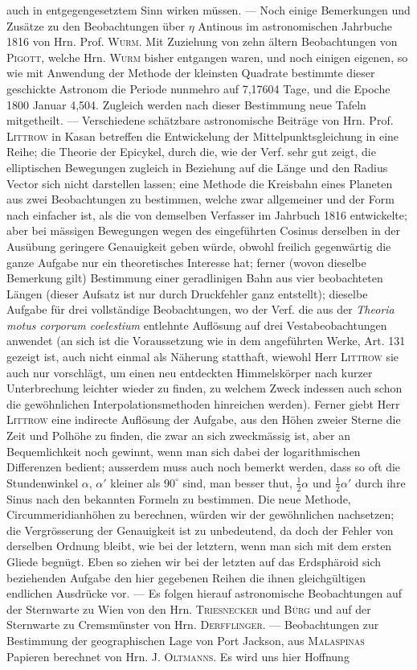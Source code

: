 auch in entgegengesetztem Sinn wirken müssen. --- Noch einige Bemerkungen und Zusätze zu den Beobachtungen über $\eta$ Antinous im astronomischen Jahrbuche 1816 von Hrn. Prof. \textsc{Wurm}. Mit Zuziehung von zehn ältern Beobachtungen von \textsc{Pigott}, welche Hrn. \textsc{Wurm} bisher entgangen waren, und noch einigen eigenen, so wie mit Anwendung der Methode der kleinsten Quadrate bestimmte dieser geschickte Astronom die Periode nunmehro auf 7,17604 Tage, und die Epoche 1800 Januar 4,504. Zugleich werden nach dieser Bestimmung neue Tafeln mitgetheilt. --- Verschiedene schätzbare astronomische Beiträge von Hrn. Prof. \textsc{Littrow} in Kasan betreffen die Entwickelung der Mittelpunktsgleichung in eine Reihe; die Theorie der Epicykel, durch die, wie der Verf. sehr gut zeigt, die elliptischen Bewegungen zugleich in Beziehung auf die Länge und den Radius Vector sich nicht darstellen lassen; eine Methode die Kreisbahn eines Planeten aus zwei Beobachtungen zu bestimmen, welche zwar allgemeiner und der Form nach einfacher ist, als die von demselben Verfasser im Jahrbuch 1816 entwickelte; aber bei mässigen Bewegungen wegen des eingeführten Cosinus derselben in der Ausübung geringere Genauigkeit geben würde, obwohl freilich gegenwärtig die ganze Aufgabe nur ein theoretisches Interesse hat; ferner (wovon dieselbe Bemerkung gilt) Bestimmung einer geradlinigen Bahn aus vier beobachteten Längen (dieser Aufsatz ist nur durch Druckfehler ganz entstellt); dieselbe Aufgabe für drei vollständige Beobachtungen, wo der Verf. die aus der \emph{Theoria motus corporum coelestium} entlehnte Auflösung auf drei Vestabeobachtungen anwendet (an sich ist die Voraussetzung wie in dem angeführten Werke, Art. 131 gezeigt ist, auch nicht einmal als Näherung statthaft, wiewohl Herr \textsc{Littrow} sie auch nur vorschlägt, um einen neu entdeckten Himmelskörper nach kurzer Unterbrechung leichter wieder zu finden, zu welchem Zweck indessen auch schon die gewöhnlichen Interpolationsmethoden hinreichen werden). Ferner giebt Herr \textsc{Littrow} eine indirecte Auflösung der Aufgabe, aus den Höhen zweier Sterne die Zeit und Polhöhe zu finden, die zwar an sich zweckmässig ist, aber an Bequemlichkeit noch gewinnt, wenn man sich dabei der logarithmischen Differenzen bedient; ausserdem muss auch noch bemerkt werden, dass so oft die Stundenwinkel $\alpha$, $\alpha'$ kleiner als $90^{\circ}$ sind, man besser thut, $\frac{1}{2}\alpha$ und $\frac{1}{2}\alpha'$ durch ihre Sinus nach den bekannten Formeln zu bestimmen. Die neue Methode, Circummeridianhöhen zu berechnen, würden wir der gewöhnlichen nachsetzen; die Vergrösserung der Genauigkeit ist zu unbedeutend, da doch der Fehler von derselben Ordnung bleibt, wie bei der letztern, wenn man sich mit dem ersten Gliede begnügt. Eben so ziehen wir bei der letzten auf das Erdsphäroid sich beziehenden Aufgabe den hier gegebenen Reihen die ihnen gleichgültigen endlichen Ausdrücke vor. --- Es folgen hierauf astronomische Beobachtungen auf der Sternwarte zu Wien von den Hrn. \textsc{Triesnecker} und \textsc{Bürg} und auf der Sternwarte zu Cremsmünster von Hrn. \textsc{Derfflinger}. --- Beobachtungen zur Bestimmung der geographischen Lage von Port Jackson, aus \textsc{Malaspinas} Papieren berechnet von Hrn. J. \textsc{Oltmanns}. Es wird uns hier Hoffnung 